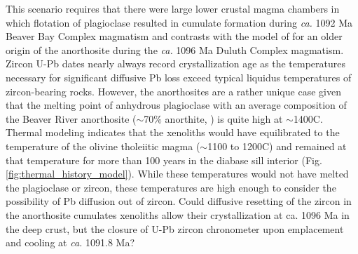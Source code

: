 This scenario requires that there were large lower crustal magma chambers in which flotation of plagioclase resulted in cumulate formation during \textit{ca.} 1092 Ma Beaver Bay Complex magmatism and contrasts with the model of \cite{Miller1997a} for an older origin of the anorthosite during the \textit{ca.} 1096 Ma Duluth Complex magmatism. Zircon U-Pb dates nearly always record crystallization age as the temperatures necessary for significant diffusive Pb loss exceed typical liquidus temperatures of zircon-bearing rocks. However, the anorthosites are a rather unique case given that the melting point of anhydrous plagioclase with an average composition of the Beaver River anorthosite ($\sim$70$\%$ anorthite, \cite{Morrison1983a, Doyle2016a}) is quite high at $\sim$1400\textdegree C. Thermal modeling indicates that the xenoliths would have equilibrated to the temperature of the olivine tholeiitic magma ($\sim$1100 to 1200\textdegree C) and remained at that temperature for more than 100 years in the diabase sill interior (Fig. \ref{fig:thermal_history_model}). While these temperatures would not have melted the plagioclase or zircon, these temperatures are high enough to consider the possibility of Pb diffusion out of zircon. Could diffusive resetting of the zircon in the anorthosite cumulates xenoliths allow their crystallization at ca. 1096 Ma in the deep crust, but the closure of U-Pb zircon chronometer upon emplacement and cooling at \textit{ca.} 1091.8 Ma?

